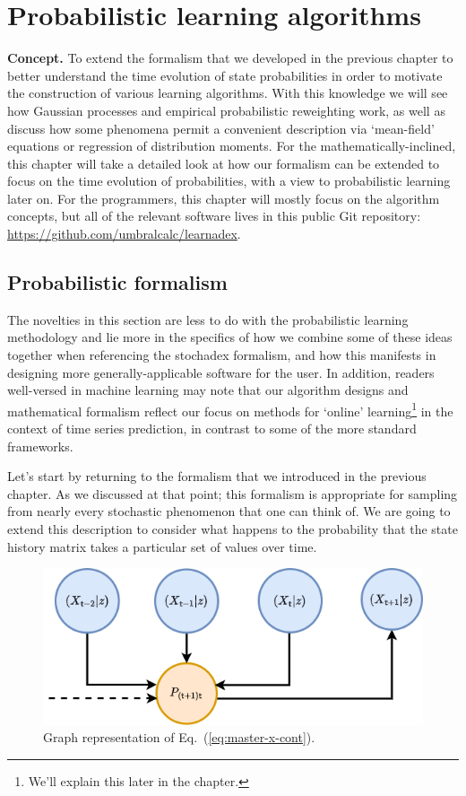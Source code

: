 \chapter{\sffamily Probabilistic learning algorithms}

{\bfseries\sffamily Concept.} To extend the formalism that we developed in the previous chapter to better understand the time evolution of state probabilities in order to motivate the construction of various learning algorithms. With this knowledge we will see how Gaussian processes and empirical probabilistic reweighting work, as well as discuss how some phenomena permit a convenient description via `mean-field' equations or regression of distribution moments. For the mathematically-inclined, this chapter will take a detailed look at how our formalism can be extended to focus on the time evolution of probabilities, with a view to probabilistic learning later on. For the programmers, this chapter will mostly focus on the algorithm concepts, but all of the relevant software lives in this public Git repository: \href{https://github.com/umbralcalc/learndadex}{https://github.com/umbralcalc/learnadex}.

\section{\sffamily Probabilistic formalism} 

The novelties in this section are less to do with the probabilistic learning methodology and lie more in the specifics of how we combine some of these ideas together when referencing the stochadex formalism, and how this manifests in designing more generally-applicable software for the user. In addition, readers well-versed in machine learning may note that our algorithm designs and mathematical formalism reflect our focus on methods for `online' learning\footnote{We'll explain this later in the chapter.} in the context of time series prediction, in contrast to some of the more standard frameworks.

Let's start by returning to the formalism that we introduced in the previous chapter. As we discussed at that point; this formalism is appropriate for sampling from nearly every stochastic phenomenon that one can think of. We are going to extend this description to consider what happens to the probability that the state history matrix takes a particular set of values over time.

\begin{figure}[h]
\centering
\includegraphics[width=12cm]{images/chapter-2-master-eq-graph.drawio.png}
\caption{Graph representation of Eq.~(\ref{eq:master-x-cont}).}
\label{fig:master-eqn}
\end{figure} 

